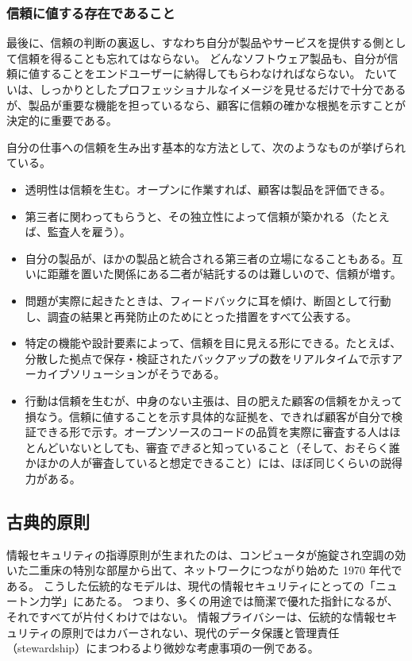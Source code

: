 \documentclass[uplatex]{jsarticle}
\begin{document}
\subsubsection{信頼に値する存在であること}

最後に、信頼の判断の裏返し、すなわち自分が製品やサービスを提供する側として信頼を得ることも忘れてはならない。
どんなソフトウェア製品も、自分が信頼に値することをエンドユーザーに納得してもらわなければならない。
たいていは、しっかりとしたプロフェッショナルなイメージを見せるだけで十分であるが、製品が重要な機能を担っているなら、顧客に信頼の確かな根拠を示すことが決定的に重要である。

自分の仕事への信頼を生み出す基本的な方法として、次のようなものが挙げられている。
\begin{itemize}
\item 透明性は信頼を生む。オープンに作業すれば、顧客は製品を評価できる。
\item 第三者に関わってもらうと、その独立性によって信頼が築かれる（たとえば、監査人を雇う）。
\item 自分の製品が、ほかの製品と統合される第三者の立場になることもある。互いに距離を置いた関係にある二者が結託するのは難しいので、信頼が増す。
\item 問題が実際に起きたときは、フィードバックに耳を傾け、断固として行動し、調査の結果と再発防止のためにとった措置をすべて公表する。
\item 特定の機能や設計要素によって、信頼を目に見える形にできる。たとえば、分散した拠点で保存・検証されたバックアップの数をリアルタイムで示すアーカイブソリューションがそうである。
\item 行動は信頼を生むが、中身のない主張は、目の肥えた顧客の信頼をかえって損なう。信頼に値することを示す具体的な証拠を、できれば顧客が自分で検証できる形で示す。オープンソースのコードの品質を実際に審査する人はほとんどいないとしても、審査\emph{できる}と知っていること（そして、おそらく誰かほかの人が審査していると想定できること）には、ほぼ同じくらいの説得力がある。
\end{itemize}

\subsection{古典的原則}

情報セキュリティの指導原則が生まれたのは、コンピュータが施錠され空調の効いた二重床の特別な部屋から出て、ネットワークにつながり始めた 1970 年代である。
こうした伝統的なモデルは、現代の情報セキュリティにとっての「ニュートン力学」にあたる。
つまり、多くの用途では簡潔で優れた指針になるが、それですべてが片付くわけではない。
情報プライバシーは、伝統的な情報セキュリティの原則ではカバーされない、現代のデータ保護と管理責任（stewardship）にまつわるより微妙な考慮事項の一例である。
\end{document}
